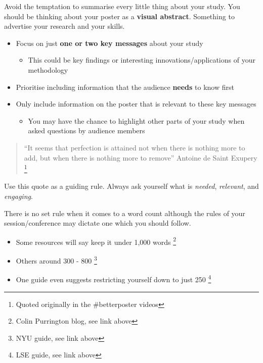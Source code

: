 \documentclass[
  titlepage]{book}
\providecommand{\tightlist}{%
  \setlength{\itemsep}{0pt}\setlength{\parskip}{0pt}}
\begin{document}
Avoid the temptation to summarise every little thing about your study. You should be thinking about your poster as a \textbf{visual abstract}. Something to advertise your research and your skills.

\begin{itemize}
\tightlist
\item
  Focus on just \textbf{one or two key messages} about your study

  \begin{itemize}
  \tightlist
  \item
    This could be key findings or interesting innovations/applications of your methodology
  \end{itemize}
\item
  Prioritise including information that the audience \textbf{needs} to know first
\item
  Only include information on the poster that is relevant to these key messages

  \begin{itemize}
  \tightlist
  \item
    You may have the chance to highlight other parts of your study when asked questions by audience members
  \end{itemize}
\end{itemize}

\begin{quote}
``It seems that perfection is attained not when there is nothing more to add, but when there is nothing more to remove'' Antoine de Saint Exupery \footnote{Quoted originally in the \#betterposter videos}
\end{quote}

Use this quote as a guiding rule. Always ask yourself what is \emph{needed}, \emph{relevant}, and \emph{engaging}.

There is no set rule when it comes to a word count although the rules of your session/conference may dictate one which you should follow.

\begin{itemize}
\tightlist
\item
  Some resources will say keep it under 1,000 words \footnote{Colin Purrington blog, see link above}
\item
  Others around 300 - 800 \footnote{NYU guide, see link above}
\item
  One guide even suggests restricting yourself down to just 250 \footnote{LSE guide, see link above}
\end{itemize}
\end{document}
